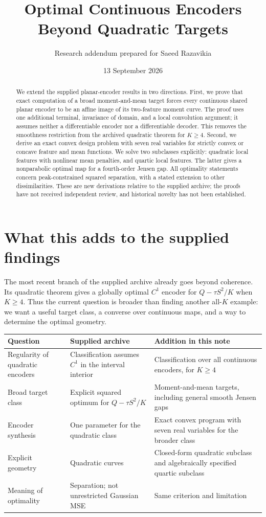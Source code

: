 \documentclass[11pt,letterpaper]{article}
\title{Optimal Continuous Encoders Beyond Quadratic Targets}
\author{Research addendum prepared for Saeed Razavikia}
\date{13 September 2026}
\theoremstyle{remark}
\begin{document}
\maketitle
\begin{abstract}
We extend the supplied planar-encoder results in two directions. First, we prove that exact computation of a broad moment-and-mean target forces every continuous shared planar encoder to be an affine image of its two-feature moment curve. The proof uses one additional terminal, invariance of domain, and a local convolution argument; it assumes neither a differentiable encoder nor a differentiable decoder. This removes the smoothness restriction from the archived quadratic theorem for $K\ge4$. Second, we derive an exact convex design problem with seven real variables for strictly convex or concave feature and mean functions. We solve two subclasses explicitly: quadratic local features with nonlinear mean penalties, and quartic local features. The latter gives a nonparabolic optimal map for a fourth-order Jensen gap. All optimality statements concern peak-constrained squared separation, with a stated extension to other dissimilarities. These are new derivations relative to the supplied archive; the proofs have not received independent review, and historical novelty has not been established.
\end{abstract}

\section{What this adds to the supplied findings}
The most recent branch of the supplied archive already goes beyond coherence. Its quadratic theorem gives a globally optimal $C^1$ encoder for $Q-\tau S^2/K$ when $K\ge4$. Thus the current question is broader than finding another all-$K$ example: we want a useful target class, a converse over continuous maps, and a way to determine the optimal geometry.

\begin{center}
\small
\begin{tabular}{@{}p{}p{}p{}@{}}
\toprule
Question & Supplied archive & Addition in this note\\
\midrule
Regularity of quadratic encoders & Classification assumes $C^1$ in the interval interior & Classification over all continuous encoders, for $K\ge4$\\[1mm]
Broad target class & Explicit squared optimum for $Q-\tau S^2/K$ & Moment-and-mean targets, including general smooth Jensen gaps\\[1mm]
Encoder synthesis & One parameter for the quadratic class & Exact convex program with seven real variables for the broader class\\[1mm]
Explicit geometry & Quadratic curves & Closed-form quadratic subclass and algebraically specified quartic subclass\\[1mm]
Meaning of optimality & Separation; not unrestricted Gaussian MSE & Same criterion and limitation\\
\bottomrule
\end{tabular}
\end{center}
\end{document}

